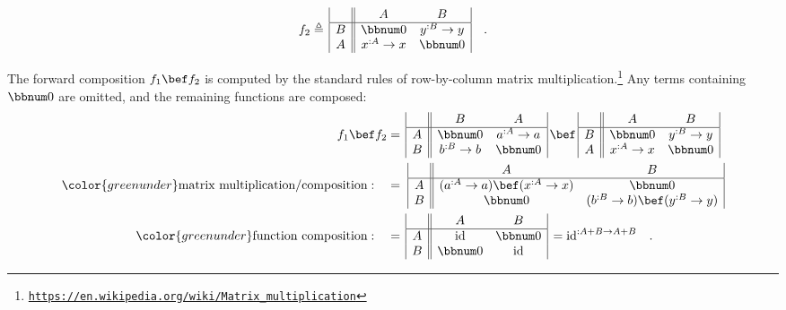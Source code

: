 \vspace{-1.5\baselineskip}
\[
f_{2}\triangleq\,\begin{array}{|c||cc|}
 & A & B\\
\hline B & \bbnum 0 & y^{:B}\rightarrow y\\
A & x^{:A}\rightarrow x & \bbnum 0
\end{array}\quad.
\]
\vspace{-0.8\baselineskip}

\noindent The forward composition $f_{1}\bef f_{2}$ is computed by
the standard rules of row-by-column matrix multiplication.\footnote{\texttt{\href{https://en.wikipedia.org/wiki/Matrix_multiplication}{https://en.wikipedia.org/wiki/Matrix\_multiplication}}}
Any terms containing $\bbnum 0$ are omitted, and the remaining functions
are composed:
\begin{align*}
f_{1}\bef f_{2} & =\,\begin{array}{|c||cc|}
 & B & A\\
\hline A & \bbnum 0 & a^{:A}\rightarrow a\\
B & b^{:B}\rightarrow b & \bbnum 0
\end{array}\,\bef\,\begin{array}{|c||cc|}
 & A & B\\
\hline B & \bbnum 0 & y^{:B}\rightarrow y\\
A & x^{:A}\rightarrow x & \bbnum 0
\end{array}\\
{\color{greenunder}\text{matrix multiplication/composition}:}\quad & =\,\,\begin{array}{|c||cc|}
 & A & B\\
\hline A & (a^{:A}\rightarrow a)\bef(x^{:A}\rightarrow x) & \bbnum 0\\
B & \bbnum 0 & (b^{:B}\rightarrow b)\bef(y^{:B}\rightarrow y)
\end{array}\\
{\color{greenunder}\text{function composition}:}\quad & =\,\begin{array}{|c||cc|}
 & A & B\\
\hline A & \text{id} & \bbnum 0\\
B & \bbnum 0 & \text{id}
\end{array}\,=\text{id}^{:A+B\rightarrow A+B}\quad.
\end{align*}

